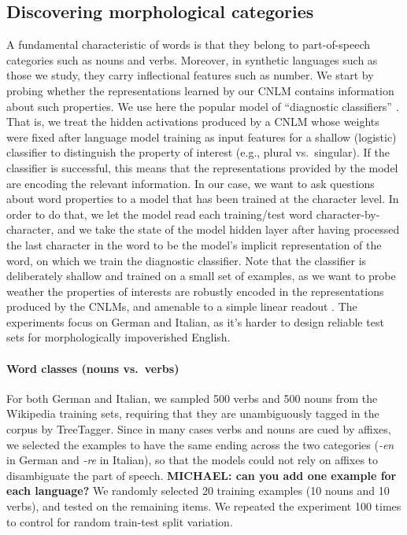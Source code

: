 \subsection{Discovering morphological categories}
\label{sec:categories}

A fundamental characteristic of words is that they belong to
part-of-speech categories such as nouns and verbs. Moreover, in
synthetic languages such as those we study, they carry inflectional
features such as number. We start by probing whether the
representations learned by our CNLM contains information about such
properties. We use here the popular model of ``diagnostic
classifiers'' \cite{Hupkes:etal:2017}. That is, we treat the hidden
activations produced by a CNLM whose weights were fixed after language model training as input features for a shallow (logistic)
classifier to distinguish the property of interest (e.g., plural
vs.~singular). If the classifier is successful, this means that the
representations provided by the model are encoding the relevant
information. In our case, we want to ask questions about word
properties to a model that has been trained at the character level. In
order to do that, we let the model read each training/test word
character-by-character, and we take the state of the model hidden
layer after having processed the last character in the word to be the
model's implicit representation of the word, on which we train the
diagnostic classifier. Note that the classifier is deliberately
shallow and trained on a small set of examples, as we want to probe
weather the properties of interests are robustly encoded in the
representations produced by the CNLMs, and amenable to a simple linear
readout \cite{Fusi:etal:2016}. %
The experiments focus on German and Italian, as it's harder to design
reliable test sets for morphologically impoverished English.

\paragraph{Word classes (nouns vs.~verbs)}

For both German and Italian, we sampled 500 verbs and 500 nouns from
the Wikipedia training sets, requiring that they are unambiguously
tagged in the corpus by TreeTagger. Since in many cases verbs and
nouns are cued by affixes, we selected the examples to have the same
ending across the two categories (\emph{-en} in German and \emph{-re}
in Italian), so that the models could not rely on affixes to
disambiguate the part of speech. \textbf{MICHAEL: can you add one
  example for each language?}  We randomly selected 20 training
examples (10 nouns and 10 verbs), and tested on the remaining items.
We repeated the experiment 100 times to control for random train-test
split variation.

